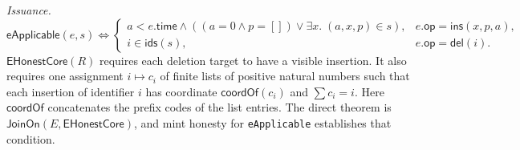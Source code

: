 \documentclass[11pt]{article}
\theoremstyle{definition}
\newcommand{\lean}[1]{\texttt{#1}}
\begin{document}
\emph{Issuance.}
\[
 \mathsf{eApplicable}(e,s)\Longleftrightarrow
 \begin{cases}
 a<e.\mathsf{time}\land((a=0\land p=[])
   \lor\exists x.\;(a,x,p)\in s),&e.\mathsf{op}=\mathsf{ins}(x,p,a),\\
 i\in\mathsf{ids}(s),&e.\mathsf{op}=\mathsf{del}(i).
 \end{cases}
\]
$\mathsf{EHonestCore}(R)$ requires each deletion target to have a visible
insertion. It also requires one assignment $i\mapsto c_i$ of finite lists of
positive natural numbers such that each insertion of identifier $i$ has
coordinate $\mathsf{coordOf}(c_i)$ and $\sum c_i=i$. Here
$\mathsf{coordOf}$ concatenates the prefix codes of the list entries.
The direct theorem is
$\mathsf{JoinOn}(E,\mathsf{EHonestCore})$, and mint honesty for
\lean{eApplicable} establishes that condition.
\end{document}
